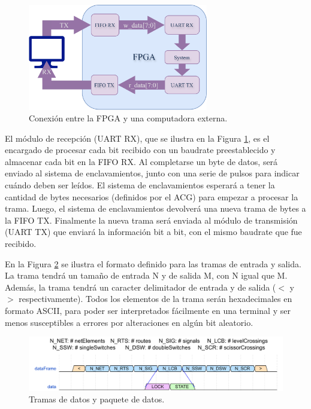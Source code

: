 	\begin{figure}[H]
		\centering
		\includegraphics[width=0.7\textwidth]{Figuras/UART_module.png}
		\centering\caption{Conexión entre la FPGA y una computadora externa.}
		\label{fig:GeneralCom}
	\end{figure}
	
	El módulo de recepción (UART RX), que se ilustra en la Figura \ref{fig:GeneralCom}, es el encargado de procesar cada bit recibido con un baudrate preestablecido y almacenar cada bit en la FIFO RX. Al completarse un byte de datos, será enviado al sistema de enclavamientos, junto con una serie de pulsos para indicar cuándo deben ser leídos. El sistema de enclavamientos esperará a tener la cantidad de bytes necesarios (definidos por el ACG) para empezar a procesar la trama. Luego, el sistema de enclavamientos devolverá una nueva trama de bytes a la FIFO TX. Finalmente la nueva trama será enviada al módulo de transmisión (UART TX) que enviará la información bit a bit, con el mismo baudrate que fue recibido.
		
	En la Figura \ref{fig:Stream} se ilustra el formato definido para las tramas de entrada y salida. La trama tendrá un tamaño de entrada N y de salida M, con N igual que M. Además, la trama tendrá un caracter delimitador de entrada y de salida ($<$ y $>$ respectivamente). Todos los elementos de la trama serán hexadecimales en formato ASCII, para poder ser interpretados fácilmente en una terminal y ser menos susceptibles a errores por alteraciones en algún bit aleatorio.
	
	\begin{figure}[H]
		\centering
		\includegraphics[width=1\textwidth]{Figuras/Tramas.png}
		\centering\caption{Tramas de datos y paquete de datos.}
		\label{fig:Stream}
	\end{figure}
	
